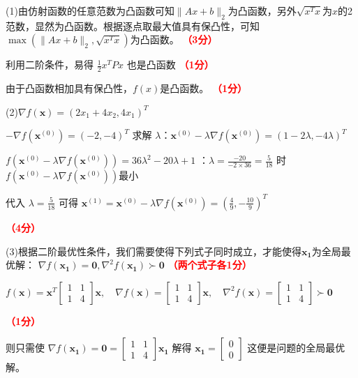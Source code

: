 \documentclass[12pt,a4paper,openany,twoside]{ctexbook}
\begin{document}
\begin{Solution}
	(1)由仿射函数的任意范数为凸函数可知$\|Ax + b\|_2$为凸函数，另外$\sqrt{x^T x}$为$x$的2范数，显然为凸函数。根据逐点取最大值具有保凸性，可知$\max(\|Ax + b\|_2, \sqrt{x^T x} )$为凸函数。
	\hfill \textcolor{red}{\textbf{（3分）}}

	利用二阶条件，易得 $\frac{1}{2}x^TPx$ 也是凸函数
	\hfill \textcolor{red}{\textbf{（1分）}}
	
	由于凸函数相加具有保凸性，$f(x)$是凸函数。
	\hfill \textcolor{red}{\textbf{（1分）}}

	(2)$\nabla f(\mathbf{x}) = (2x_1+4x_2,4x_1)^T$

$-\nabla f(\mathbf{x}^{(0)}) =(-2,-4)^T$ 求解 $\lambda$：$\mathbf{x}^{(0)}-\lambda\nabla f(\mathbf{x}^{(0)})=(1-2\lambda,-4\lambda)^T$

$f(\mathbf{x}^{(0)}-\lambda\nabla f(\mathbf{x}^{(0)}))=36\lambda^2-20\lambda+1$ ：$\lambda=\frac{-20}{-2 ×36}=\frac{5}{18}$ 时 $f(\mathbf{x}^{(0)}-\lambda\nabla f(\mathbf{x}^{(0)}))$最小

代入 $\lambda=\frac{5}{18}$ 可得 $\mathbf{x}^{(1)}=\mathbf{x}^{(0)}-\lambda\nabla f(\mathbf{x}^{(0)})=(\frac{4}{9},-\frac{10}{9})^T$

\hfill \textcolor{red}{\textbf{（4分）}}

(3)根据二阶最优性条件，我们需要使得下列式子同时成立，才能使得$\mathbf{x_1}$为全局最优解：
$\nabla f(\mathbf{x_1})=\mathbf{0},{\nabla }^2 f(\mathbf{x_1})\succ \mathbf{0}$
\hfill \textcolor{red}{\textbf{（两个式子各1分）}}

$f(\mathbf{x})=\mathbf{x}^T \begin{bmatrix}  
	1 & 1 \\  
	1 & 4  
	\end{bmatrix}\mathbf{x},\quad \nabla f(\mathbf{x})=\begin{bmatrix}  
	1 & 1 \\  
	1 & 4  
	\end{bmatrix}\mathbf{x},\quad {\nabla}^2 f(\mathbf{x})=\begin{bmatrix}  
	1 & 1 \\  
	1 & 4  
	\end{bmatrix}\succ \mathbf{0}$

	\hfill \textcolor{red}{\textbf{（1分）}}

	则只需使 $\nabla f(\mathbf{x_1})=\mathbf{0}=\begin{bmatrix}  
		1 & 1 \\  
		1 & 4  
		\end{bmatrix}\mathbf{x_1}$ 解得 $\mathbf{x_1}=\begin{bmatrix}  
		0 \\  
		0  
		\end{bmatrix}$ 这便是问题的全局最优解。


\end{Solution}
\end{document}

